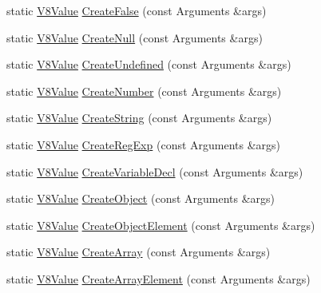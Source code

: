 \begin{DoxyCompactItemize}
\item 
static \hyperlink{namespacemocha_a22eca0d76f439fca2a26cae77eb6ade4}{V8Value} \hyperlink{classmocha_1_1_j_s_ast_a14e271ca973a64d0ddf69c61ded5d1fc}{CreateFalse} (const Arguments \&args)
\item 
static \hyperlink{namespacemocha_a22eca0d76f439fca2a26cae77eb6ade4}{V8Value} \hyperlink{classmocha_1_1_j_s_ast_a8501356bb500f2a9cf88f14980af2cd2}{CreateNull} (const Arguments \&args)
\item 
static \hyperlink{namespacemocha_a22eca0d76f439fca2a26cae77eb6ade4}{V8Value} \hyperlink{classmocha_1_1_j_s_ast_a1e0ed36d9aa9f203e90431f2dbb53c4c}{CreateUndefined} (const Arguments \&args)
\item 
static \hyperlink{namespacemocha_a22eca0d76f439fca2a26cae77eb6ade4}{V8Value} \hyperlink{classmocha_1_1_j_s_ast_a00e7009afcce018961cfe70baae686cc}{CreateNumber} (const Arguments \&args)
\item 
static \hyperlink{namespacemocha_a22eca0d76f439fca2a26cae77eb6ade4}{V8Value} \hyperlink{classmocha_1_1_j_s_ast_a580caa154e03f6e8430ff0fb8c4d8200}{CreateString} (const Arguments \&args)
\item 
static \hyperlink{namespacemocha_a22eca0d76f439fca2a26cae77eb6ade4}{V8Value} \hyperlink{classmocha_1_1_j_s_ast_a60d0b14bf783b5a51e952e64a1700739}{CreateRegExp} (const Arguments \&args)
\item 
static \hyperlink{namespacemocha_a22eca0d76f439fca2a26cae77eb6ade4}{V8Value} \hyperlink{classmocha_1_1_j_s_ast_a0f0fd645a4bb7d6bc41095434f23ac2f}{CreateVariableDecl} (const Arguments \&args)
\item 
static \hyperlink{namespacemocha_a22eca0d76f439fca2a26cae77eb6ade4}{V8Value} \hyperlink{classmocha_1_1_j_s_ast_a6ffd7357b95ad83f2232204ac8d17cbb}{CreateObject} (const Arguments \&args)
\item 
static \hyperlink{namespacemocha_a22eca0d76f439fca2a26cae77eb6ade4}{V8Value} \hyperlink{classmocha_1_1_j_s_ast_ab7e75787946bafd88c645e69c901e7c8}{CreateObjectElement} (const Arguments \&args)
\item 
static \hyperlink{namespacemocha_a22eca0d76f439fca2a26cae77eb6ade4}{V8Value} \hyperlink{classmocha_1_1_j_s_ast_af51ed33509f9baeaa07d7fc9827da329}{CreateArray} (const Arguments \&args)
\item 
static \hyperlink{namespacemocha_a22eca0d76f439fca2a26cae77eb6ade4}{V8Value} \hyperlink{classmocha_1_1_j_s_ast_a23896a0eb295b57a4ab49db54aef3caf}{CreateArrayElement} (const Arguments \&args)
\end{DoxyCompactItemize}


